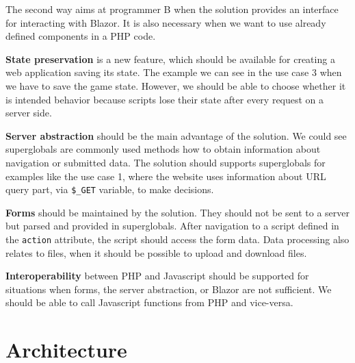 The second way aims at programmer B when the solution provides an interface for interacting with Blazor.
It is also necessary when we want to use already defined components in a PHP code.
\par
\textbf{State preservation} is a new feature, which should be available for creating a web application saving its state.
The example we can see in the use case 3 when we have to save the game state.
However, we should be able to choose whether it is intended behavior because scripts lose their state after every request on a server side.
\par
\textbf{Server abstraction} should be the main advantage of the solution.
We could see superglobals are commonly used methods how to obtain information about navigation or submitted data.
The solution should supports superglobals for examples like the use case 1, where the website uses information about URL query part, via \texttt{\$\_GET} variable, to make decisions.
\par
\textbf{Forms} should be maintained by the solution. 
They should not be sent to a server but parsed and provided in superglobals. 
After navigation to a script defined in the \texttt{action} attribute, the script should access the form data.
Data processing also relates to files, when it should be possible to upload and download files.
\par
\textbf{Interoperability} between PHP and Javascript should be supported for situations when forms, the server abstraction, or Blazor are not sufficient.
We should be able to call Javascript functions from PHP and vice-versa.

\section{Architecture}


